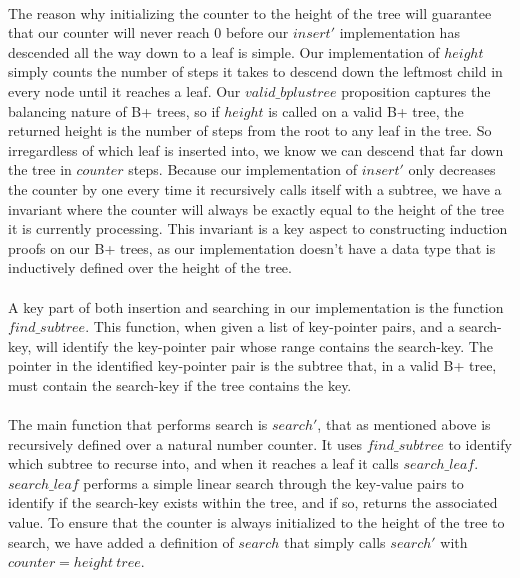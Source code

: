 \paragraph{}
The reason why initializing the counter to the height of the tree will guarantee that our counter will never reach $0$ before our $insert'$ implementation has descended all the way down to a leaf is simple. Our implementation of $height$ simply counts the number of steps it takes to descend down the leftmost child in every node until it reaches a leaf. Our $valid\_bplustree$ proposition captures the balancing nature of B+ trees, so if $height$ is called on a valid B+ tree, the returned height is the number of steps from the root to any leaf in the tree. So irregardless of which leaf is inserted into, we know we can descend that far down the tree in $counter$ steps. Because our implementation of $insert'$ only decreases the counter by one every time it recursively calls itself with a subtree, we have a invariant where the counter will always be exactly equal to the height of the tree it is currently processing. This invariant is a key aspect to constructing induction proofs on our B+ trees, as our implementation doesn't have a data type that is inductively defined over the height of the tree.

\paragraph{}
A key part of both insertion and searching in our implementation is the function $find\_subtree$. This function, when given a list of key-pointer pairs, and a search-key, will identify the key-pointer pair whose range contains the search-key. The pointer in the identified key-pointer pair is the subtree that, in a valid B+ tree, must contain the search-key if the tree contains the key.

\paragraph{}
The main function that performs search is $search'$, that as mentioned above is recursively defined over a natural number counter. It uses $find\_subtree$ to identify which subtree to recurse into, and when it reaches a leaf it calls $search\_leaf$. $search\_leaf$ performs a simple linear search through the key-value pairs to identify if the search-key exists within the tree, and if so, returns the associated value. To ensure that the counter is always initialized to the height of the tree to search, we have added a definition of $search$ that simply calls $search'$ with $counter = height~tree$.

